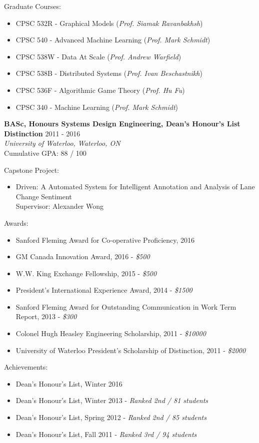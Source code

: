 \documentclass[10pt]{res} %
\begin{document}
Graduate Courses:
\begin{itemize} 
    \item CPSC 532R - Graphical Models (\emph{Prof. Siamak Ravanbakhsh})
    \item CPSC 540 - Advanced Machine Learning (\emph{Prof. Mark
    Schmidt})
    \item CPSC 538W - Data At Scale (\emph{Prof. Andrew Warfield})
    \item CPSC 538B - Distributed Systems (\emph{Prof. Ivan
    Beschastnikh})
    \item CPSC 536F - Algorithmic Game Theory (\emph{Prof. Hu Fu})
    \item CPSC 340 - Machine Learning (\emph{Prof. Mark Schmidt})
\end{itemize}


\textbf {BASc, Honours Systems Design Engineering, Dean's Honour's List Distinction} \hfill 2011 - 2016 \\ 
{\sl University of Waterloo, Waterloo, ON} \\
Cumulative GPA: 88 / 100

Capstone Project:
\begin{itemize}   
    \item Driven: A Automated System for Intelligent Annotation and Analysis of Lane Change Sentiment\\
    Supervisor: Alexander Wong
\end{itemize}

Awards:
\begin{itemize} 
    \item Sanford Fleming Award for Co-operative Proficiency, 2016
    \item GM Canada Innovation Award, 2016 - {\sl\$500}
    \item W.W. King Exchange Fellowship, 2015 - {\sl\$500}
    \item President's International Experience Award, 2014 - {\sl\$1500}
    \item Sanford Fleming Award for Outstanding Communication in Work Term Report, 2013 - {\sl\$300}
    \item Colonel Hugh Heasley Engineering Scholarship, 2011 - {\sl\$10000}
    \item University of Waterloo President's Scholarship of Distinction, 2011 - {\sl\$2000}
\end{itemize}

Achievements:
\begin{itemize} 
    \item Dean's Honour's List, Winter 2016
    \item Dean's Honour's List, Winter 2013 - {\sl Ranked 2nd / 81 students}
    \item Dean's Honour's List, Spring 2012 - {\sl Ranked 2nd / 85 students}
    \item Dean's Honour's List, Fall 2011 - {\sl Ranked 3rd / 94 students}
\end{itemize}
\end{document}
